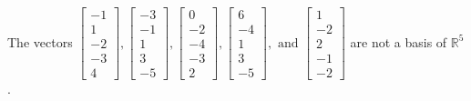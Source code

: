 \begin{exercise}
\begin{exerciseStatement}
  \end{exerciseStatement}
  \begin{exerciseAnswer}
   The vectors \(\left[\begin{array}{r}
-1 \\
1 \\
-2 \\
-3 \\
4
\end{array}\right] , \left[\begin{array}{r}
-3 \\
-1 \\
1 \\
3 \\
-5
\end{array}\right] , \left[\begin{array}{r}
0 \\
-2 \\
-4 \\
-3 \\
2
\end{array}\right] , \left[\begin{array}{r}
6 \\
-4 \\
1 \\
3 \\
-5
\end{array}\right] , \text{ and } \left[\begin{array}{r}
1 \\
-2 \\
2 \\
-1 \\
-2
\end{array}\right]\) 
  	 are not  a basis of \(\mathbb{R}^5\).
  


  \end{exerciseAnswer}
\end{exercise}